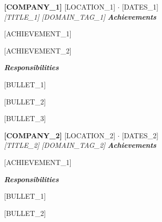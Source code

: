 \documentclass[10pt,letterpaper]{article}
\renewenvironment{itemize}
  {\begin{olditemize}\setlength{\itemsep}{1pt}\setlength{\parskip}{0pt}\setlength{\topsep}{0pt}\setlength{\leftmargini}{1.1em}}
  {\end{olditemize}}
\newcommand{\subblock}[1]{\needspace{5\baselineskip}\vspace{1pt}\textit{\textbf{#1}}\vspace{-6pt}}
\begin{document}
%
%
\noindent\textbf{[COMPANY_1]} \hfill [LOCATION_1] $\cdot$ [DATES_1]\\
\textit{[TITLE_1]} \hfill \textit{[DOMAIN_TAG_1]}
\subblock{Achievements}
\begin{itemize}
    \item{} [ACHIEVEMENT_1]
    \item{} [ACHIEVEMENT_2]
\end{itemize}
\subblock{Responsibilities}
\begin{itemize}
    \item{} [BULLET_1]
    \item{} [BULLET_2]
    \item{} [BULLET_3]
\end{itemize}

\noindent\textbf{[COMPANY_2]} \hfill [LOCATION_2] $\cdot$ [DATES_2]\\
\textit{[TITLE_2]} \hfill \textit{[DOMAIN_TAG_2]}
\subblock{Achievements}
\begin{itemize}
    \item{} [ACHIEVEMENT_1]
\end{itemize}
\subblock{Responsibilities}
\begin{itemize}
    \item{} [BULLET_1]
    \item{} [BULLET_2]
\end{itemize}
\end{document}
